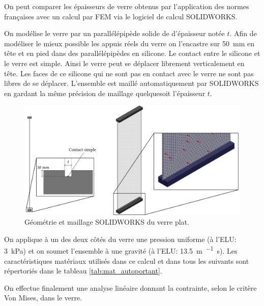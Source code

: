 \documentclass[11pt,titlepage]{article}
\begin{document}
On peut comparer les épaisseurs de verre obtenus par l'application des normes françaises avec un calcul par \acrfull{FEM} via le logiciel de calcul SOLIDWORKS.

On modélise le verre par un parallélépipède solide de  d'épaisseur notée $t$. Afin de modéliser le mieux possible les appuis réels du verre on l'encastre sur \qty{50}{\milli\metre} en tête et en pied dans des parallélépipèdes en silicone. Le contact entre le silicone et le verre est simple. Ainsi le verre peut se déplacer librement verticalement en tête. Les faces de ce silicone qui ne sont pas en contact avec le verre ne sont pas libres de se déplacer. L'ensemble est maillé automatiquement par SOLIDWORKS en gardant la même précision de maillage quelquesoit l'épaisseur $t$. 

\begin{figure}[H]
    \centering
    \includegraphics[width=\textwidth]{img/plat/fem.pdf}
    \caption{Géométrie et maillage SOLIDWORKS du verre plat.}
    \label{fig:fem_plat}
\end{figure}

On applique à un des deux côtés du verre une pression uniforme (à l'\acrshort{ELU}: \qty{3}{\kilo\pascal}) et on soumet l'ensemble à une gravité (à l'\acrshort{ELU}: \qty{13.5}{\metre\per\squared\second}). Les caractéristiques matériaux utilisés dans ce calcul et dans tous les suivants sont répertoriés dans le tableau \ref{tab:mat_autoportant}. 

On effectue finalement une analyse linéaire donnant la contrainte, selon le critère Von Mises, dans le verre. 
\end{document}
